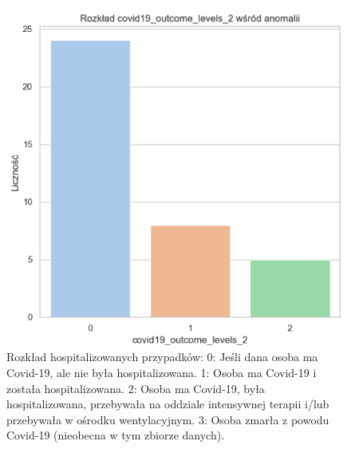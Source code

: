 \documentclass[a4paper,fleqn]{cas-dc}
\begin{document}
\begin{figure}[h]
	\includegraphics[scale=.73]{wykresy/wykres10.png}
	\caption{Rozkład hospitalizowanych przypadków: 0: Jeśli dana osoba ma Covid-19, ale nie była hospitalizowana.
1: Osoba ma Covid-19 i została hospitalizowana.
2: Osoba ma Covid-19, była hospitalizowana, przebywała na oddziale intensywnej terapii i/lub przebywała w ośrodku wentylacyjnym.
3: Osoba zmarła z powodu Covid-19 (nieobecna w tym zbiorze danych).}
	\label{FIG:1}
\end{figure}
\end{document}

